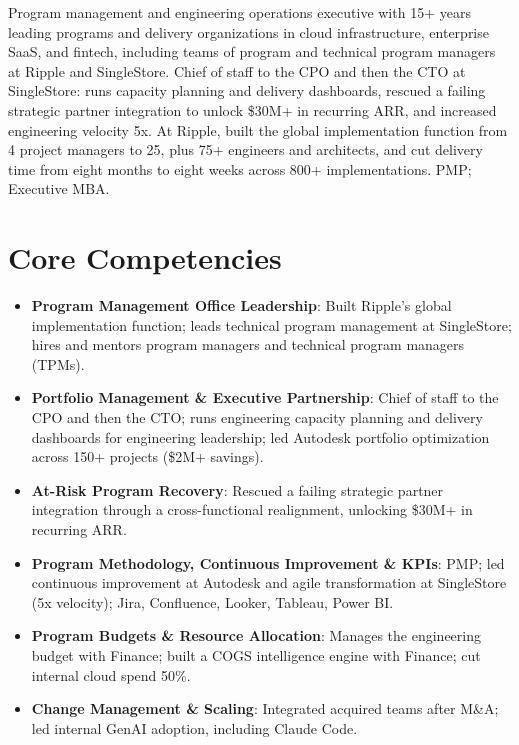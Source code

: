\documentclass[11pt,letterpaper,sans]{moderncv}
\begin{document}
\makecvtitle




\vspace{6pt}
\small{Program management and engineering operations executive with 15+ years leading programs and delivery organizations in cloud infrastructure, enterprise SaaS, and fintech, including teams of program and technical program managers at Ripple and SingleStore. Chief of staff to the CPO and then the CTO at SingleStore: runs capacity planning and delivery dashboards, rescued a failing strategic partner integration to unlock \$30M+ in recurring ARR, and increased engineering velocity 5x. At Ripple, built the global implementation function from 4 project managers to 25, plus 75+ engineers and architects, and cut delivery time from eight months to eight weeks across 800+ implementations. PMP; Executive MBA.}


\section{Core Competencies}
\vspace{1pt}
\begin{itemize}

\item \textbf{Program Management Office Leadership}: Built Ripple's global implementation function; leads technical program management at SingleStore; hires and mentors program managers and technical program managers (TPMs).

\item \textbf{Portfolio Management \& Executive Partnership}: Chief of staff to the CPO and then the CTO; runs engineering capacity planning and delivery dashboards for engineering leadership; led Autodesk portfolio optimization across 150+ projects (\$2M+ savings).

\item \textbf{At-Risk Program Recovery}: Rescued a failing strategic partner integration through a cross-functional realignment, unlocking \$30M+ in recurring ARR.

\item \textbf{Program Methodology, Continuous Improvement \& KPIs}: PMP; led continuous improvement at Autodesk and agile transformation at SingleStore (5x velocity); Jira, Confluence, Looker, Tableau, Power BI.

\item \textbf{Program Budgets \& Resource Allocation}: Manages the engineering budget with Finance; built a COGS intelligence engine with Finance; cut internal cloud spend 50\%.

\item \textbf{Change Management \& Scaling}: Integrated acquired teams after M\&A; led internal GenAI adoption, including Claude Code.

\end{itemize}
\end{document}
